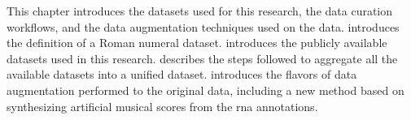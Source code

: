 
This chapter introduces the datasets used for this research,
the data curation workflows, and the data augmentation
techniques used on the data.
 introduces the definition
of a Roman numeral dataset. 
introduces the publicly available datasets used in this
research.  describes
the steps followed to aggregate all the available datasets
into a unified dataset.  introduces
the flavors of data augmentation performed to the original
data, including a new method based on synthesizing
artificial musical scores from the \gls{rna} annotations.

